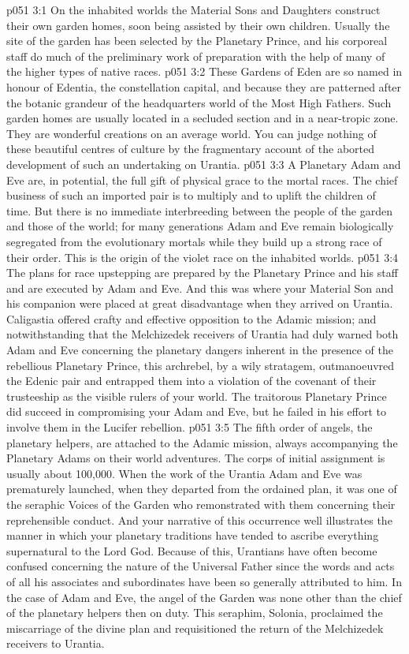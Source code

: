 \vs p051 3:1 On the inhabited worlds the Material Sons and Daughters construct their own garden homes, soon being assisted by their own children. Usually the site of the garden has been selected by the Planetary Prince, and his corporeal staff do much of the preliminary work of preparation with the help of many of the higher types of native races.
\vs p051 3:2 These Gardens of Eden are so named in honour of Edentia, the constellation capital, and because they are patterned after the botanic grandeur of the headquarters world of the Most High Fathers. Such garden homes are usually located in a secluded section and in a near\hyp{}tropic zone. They are wonderful creations on an average world. You can judge nothing of these beautiful centres of culture by the fragmentary account of the aborted development of such an undertaking on Urantia.
\vs p051 3:3 \pc A Planetary Adam and Eve are, in potential, the full gift of physical grace to the mortal races. The chief business of such an imported pair is to multiply and to uplift the children of time. But there is no immediate interbreeding between the people of the garden and those of the world; for many generations Adam and Eve remain biologically segregated from the evolutionary mortals while they build up a strong race of their order. This is the origin of the violet race on the inhabited worlds.
\vs p051 3:4 The plans for race upstepping are prepared by the Planetary Prince and his staff and are executed by Adam and Eve. And this was where your Material Son and his companion were placed at great disadvantage when they arrived on Urantia. Caligastia offered crafty and effective opposition to the Adamic mission; and notwithstanding that the Melchizedek receivers of Urantia had duly warned both Adam and Eve concerning the planetary dangers inherent in the presence of the rebellious Planetary Prince, this archrebel, by a wily stratagem, outmanoeuvred the Edenic pair and entrapped them into a violation of the covenant of their trusteeship as the visible rulers of your world. The traitorous Planetary Prince did succeed in compromising your Adam and Eve, but he failed in his effort to involve them in the Lucifer rebellion.
\vs p051 3:5 \pc The fifth order of angels, the planetary helpers, are attached to the Adamic mission, always accompanying the Planetary Adams on their world adventures. The corps of initial assignment is usually about 100,000. When the work of the Urantia Adam and Eve was prematurely launched, when they departed from the ordained plan, it was one of the seraphic Voices of the Garden who remonstrated with them concerning their reprehensible conduct. And your narrative of this occurrence well illustrates the manner in which your planetary traditions have tended to ascribe everything supernatural to the Lord God. Because of this, Urantians have often become confused concerning the nature of the Universal Father since the words and acts of all his associates and subordinates have been so generally attributed to him. In the case of Adam and Eve, the angel of the Garden was none other than the chief of the planetary helpers then on duty. This seraphim, Solonia, proclaimed the miscarriage of the divine plan and requisitioned the return of the Melchizedek receivers to Urantia.
